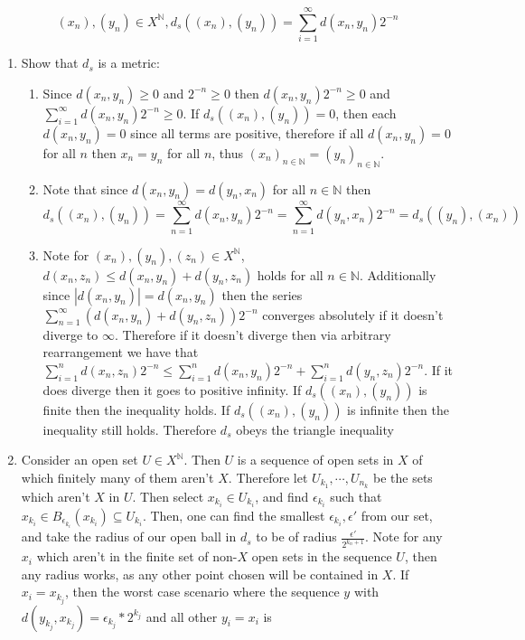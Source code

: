 \documentclass[12pt, letterpaper]{article}
\newcommand{\N}{\mathbb{N}}
\begin{document}
\begin{enumerate}
$$	(x_n), (y_n) \in X^\N, d_s((x_n), (y_n)) = \sum_{i=1}^\infty d(x_n,y_n)2^{-n}
	$$
	\begin{enumerate}
		\item Show that $d_s$ is a metric:
		\begin{enumerate}
			\item Since $d(x_n,y_n) \geq 0$ and $2^{-n}\geq 0$ then $d(x_n,y_n)2^{-n} \geq 0$ and $\sum_{i=1}^\infty d(x_n,y_n)2^{-n} \geq 0$.  If $d_s((x_n),(y_n)) = 0$, 
			then each $d(x_n,y_n) = 0$ since all terms are positive, therefore if all
			$d(x_n, y_n) = 0$ for all $n$ then $x_n = y_n$ for all $n$, thus 
			$(x_n)_{n \in \N} = (y_n)_{n \in \N}$.
			\item Note that since $d(x_n, y_n) = d(y_n,x_n)$ for all $n\in \N$ then 
			$$
			d_s((x_n),(y_n)) = \sum_{n = 1}^\infty d(x_n, y_n)2^{-n} = \sum_{n = 1}^\infty d(y_n, x_n)2^{-n} = d_s((y_n),(x_n))
			$$
			\item Note for $(x_n), (y_n), (z_n) \in X^\N$, $d(x_n,z_n) \leq d(x_n,y_n) + d(y_n,z_n)$ holds for all $n \in \N$.  Additionally since $|d(x_n, y_n)| = d(x_n, y_n)$
			then the series $\sum_{n = 1}^\infty (d(x_n,y_n) + d(y_n,z_n))2^{-n}$
			converges absolutely if it doesn't diverge to $\infty$.  Therefore 
			if it doesn't diverge then via arbitrary rearrangement we have that 
			$\sum_{i=1}^n d(x_n,z_n)2^{-n} \leq \sum_{i=1}^n d(x_n,y_n)2^{-n} + \sum_{i=1}^n d(y_n,z_n)2^{-n}$.  If it does diverge then it goes to positive infinity.  
			If $d_s((x_n),(y_n))$ is finite then the inequality holds.  If $d_s((x_n),(y_n))$ is infinite then the inequality still holds.  Therefore $d_s$ obeys the triangle inequality
		\end{enumerate}
		\item Consider an open set $U \in X^\N$.  Then $U$ is a sequence 
		of open sets in $X$ of which finitely many of them aren't $X$.  Therefore 
		let $U_{k_1},\cdots, U_{n_k}$ be the sets which aren't $X$ in $U$.  Then select 
		$x_{k_i} \in U_{k_i}$, and find $\epsilon_{k_i}$ such that $x_{k_i} \in B_{\epsilon_{k_i}}(x_{k_i}) \subseteq U_{k_i}$.  Then, one can find the smallest $\epsilon_{k_i}, \epsilon'$ from our set, and take the radius of our open ball in $d_s$ to be 
		of radius $\frac{\epsilon'}{2^{k_n + 1}}$.  Note for any $x_i$ which aren't in 
		the finite set of non-$X$ open sets in the sequence $U$, then any radius works,
		as any other point chosen will be contained in $X$.  If $x_i = x_{k_j}$, then 
		the worst case scenario where the sequence $y$ with $d(y_{k_j},x_{k_j}) = \epsilon_{k_j}*2^{k_j}$ and all other $y_i = x_i$ is 

\end{enumerate}
\end{enumerate}
\end{document}
